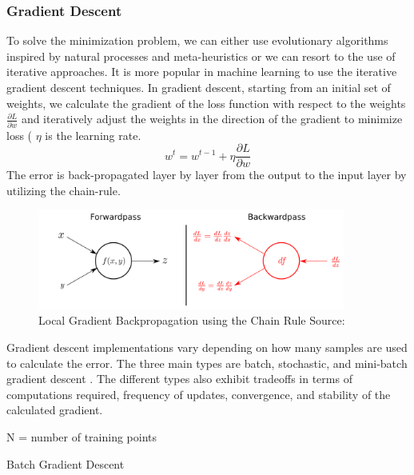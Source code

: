 \subsubsection{Gradient Descent}


To solve the minimization problem, we can either use evolutionary algorithms inspired by natural processes and meta-heuristics or we can resort to the use of iterative approaches. It is more popular in machine learning to use the iterative gradient descent techniques. In gradient descent, starting from an initial set of weights, we calculate the gradient of the loss function with respect to the weights  $  \frac{\partial L}{\partial w}  $ and iteratively adjust the weights in the direction of the gradient to minimize loss ( $ \eta $ is the learning rate.
\begin{equation}
 w^{t} = w^{t-1} +  \eta \frac{\partial L}{\partial w} 
\end{equation}
The error is back-propagated layer by layer from the output to the input layer by utilizing the chain-rule.
 
 \begin{figure}[h!]
\centering
\includegraphics[width=0.9\textwidth]{Figures/backprop}
\caption[Backprop]{ Local Gradient Backpropagation using the Chain Rule Source:\footnotemark} 
\label{fig:Forward and Backward Passs}
\end{figure}
 

Gradient descent implementations vary depending on how many samples are used to calculate the error. The three main types are batch, stochastic, and mini-batch gradient descent \cite{ruder2016overview}. The different types also exhibit tradeoffs in terms of computations required, frequency of updates, convergence, and stability of the calculated gradient. 

\begin{minipage}{.7\linewidth}
\begin{algorithm}[H]
N = number of training points\;
 \caption{Batch Gradient Descent}
\end{algorithm}
\end{minipage}

